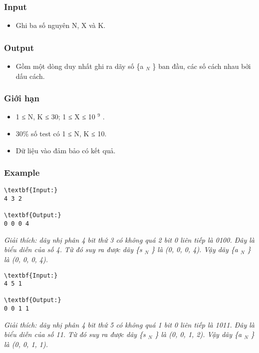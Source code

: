 \subsubsection{   Input  }
\begin{itemize}
	\item     Ghi ba số nguyên N, X và K.   
\end{itemize}

\subsubsection{   Output  }
\begin{itemize}
	\item     Gồm một dòng duy nhất ghi ra dãy số \{a    $_     N    $    \} ban đầu, các số cách nhau bởi dấu cách.   
\end{itemize}

\subsubsection{   Giới hạn  }
\begin{itemize}
	\item     1 ≤ N, K ≤ 30; 1 ≤ X ≤ 10    $^     9    $    .   
	\item     30\% số test có 1 ≤ N, K ≤ 10.   
	\item     Dữ liệu vào đảm bảo có kết quả.   
\end{itemize}

\subsubsection{   Example  }
\begin{verbatim}
\textbf{Input:}
4 3 2

\textbf{Output:}
0 0 0 4\end{verbatim}

\emph{    Giải thích: dãy nhị phân 4 bit thứ 3 có không quá 2 bit 0 liên tiếp là 0100. Đây là biểu diễn của số 4. Từ đó suy ra được dãy \{s    $_     N    $    \} là (0, 0, 0, 4). Vậy dãy \{a    $_     N    $    \} là (0, 0, 0, 4).   }
\begin{verbatim}
\textbf{Input:}
4 5 1

\textbf{Output:}
0 0 1 1\end{verbatim}

\emph{    Giải thích: dãy nhị phân 4 bit thứ 5 có không  quá 1 bit 0 liên tiếp là 1011. Đây là biểu diễn của số 11. Từ đó suy ra  được dãy \{s    $_     N    $    \} là (0, 0, 1, 2). Vậy dãy \{a    $_     N    $    \} là (0, 0, 1, 1).   }